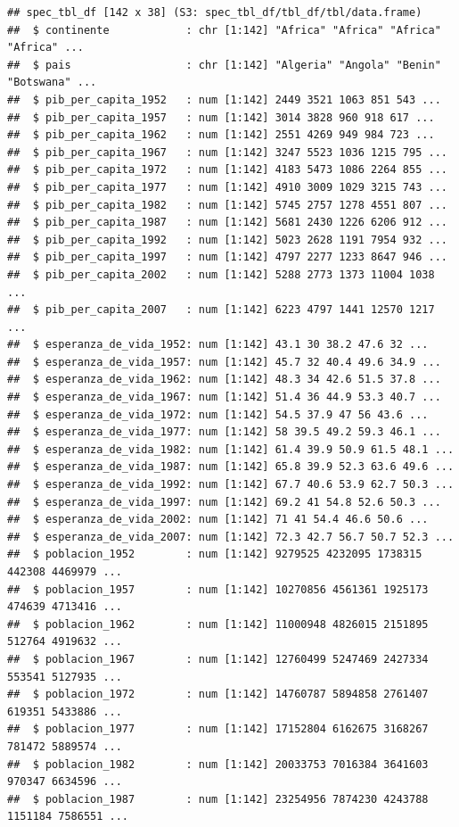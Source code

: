 \documentclass[
  openany]{book}
\begin{document}
\begin{verbatim}
## spec_tbl_df [142 x 38] (S3: spec_tbl_df/tbl_df/tbl/data.frame)
##  $ continente            : chr [1:142] "Africa" "Africa" "Africa" "Africa" ...
##  $ pais                  : chr [1:142] "Algeria" "Angola" "Benin" "Botswana" ...
##  $ pib_per_capita_1952   : num [1:142] 2449 3521 1063 851 543 ...
##  $ pib_per_capita_1957   : num [1:142] 3014 3828 960 918 617 ...
##  $ pib_per_capita_1962   : num [1:142] 2551 4269 949 984 723 ...
##  $ pib_per_capita_1967   : num [1:142] 3247 5523 1036 1215 795 ...
##  $ pib_per_capita_1972   : num [1:142] 4183 5473 1086 2264 855 ...
##  $ pib_per_capita_1977   : num [1:142] 4910 3009 1029 3215 743 ...
##  $ pib_per_capita_1982   : num [1:142] 5745 2757 1278 4551 807 ...
##  $ pib_per_capita_1987   : num [1:142] 5681 2430 1226 6206 912 ...
##  $ pib_per_capita_1992   : num [1:142] 5023 2628 1191 7954 932 ...
##  $ pib_per_capita_1997   : num [1:142] 4797 2277 1233 8647 946 ...
##  $ pib_per_capita_2002   : num [1:142] 5288 2773 1373 11004 1038 ...
##  $ pib_per_capita_2007   : num [1:142] 6223 4797 1441 12570 1217 ...
##  $ esperanza_de_vida_1952: num [1:142] 43.1 30 38.2 47.6 32 ...
##  $ esperanza_de_vida_1957: num [1:142] 45.7 32 40.4 49.6 34.9 ...
##  $ esperanza_de_vida_1962: num [1:142] 48.3 34 42.6 51.5 37.8 ...
##  $ esperanza_de_vida_1967: num [1:142] 51.4 36 44.9 53.3 40.7 ...
##  $ esperanza_de_vida_1972: num [1:142] 54.5 37.9 47 56 43.6 ...
##  $ esperanza_de_vida_1977: num [1:142] 58 39.5 49.2 59.3 46.1 ...
##  $ esperanza_de_vida_1982: num [1:142] 61.4 39.9 50.9 61.5 48.1 ...
##  $ esperanza_de_vida_1987: num [1:142] 65.8 39.9 52.3 63.6 49.6 ...
##  $ esperanza_de_vida_1992: num [1:142] 67.7 40.6 53.9 62.7 50.3 ...
##  $ esperanza_de_vida_1997: num [1:142] 69.2 41 54.8 52.6 50.3 ...
##  $ esperanza_de_vida_2002: num [1:142] 71 41 54.4 46.6 50.6 ...
##  $ esperanza_de_vida_2007: num [1:142] 72.3 42.7 56.7 50.7 52.3 ...
##  $ poblacion_1952        : num [1:142] 9279525 4232095 1738315 442308 4469979 ...
##  $ poblacion_1957        : num [1:142] 10270856 4561361 1925173 474639 4713416 ...
##  $ poblacion_1962        : num [1:142] 11000948 4826015 2151895 512764 4919632 ...
##  $ poblacion_1967        : num [1:142] 12760499 5247469 2427334 553541 5127935 ...
##  $ poblacion_1972        : num [1:142] 14760787 5894858 2761407 619351 5433886 ...
##  $ poblacion_1977        : num [1:142] 17152804 6162675 3168267 781472 5889574 ...
##  $ poblacion_1982        : num [1:142] 20033753 7016384 3641603 970347 6634596 ...
##  $ poblacion_1987        : num [1:142] 23254956 7874230 4243788 1151184 7586551 ...

\end{verbatim}
\end{document}
